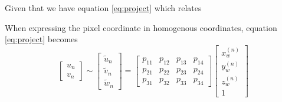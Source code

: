 Given that we have equation \ref{eq:project} which relates



When expressing the pixel coordinate in homogenous coordinates, equation \ref{eq:project} becomes
\begin{equation}
    \begin{bmatrix}
        u_n \\ v_n
    \end{bmatrix}
    \sim
    \begin{bmatrix}
        \widetilde{u}_n \\ \widetilde{v}_n \\ \widetilde{w}_n
    \end{bmatrix}
    =
    \begin{bmatrix}
        p_{11} & p_{12} & p_{13} & p_{14} \\
        p_{21} & p_{22} & p_{23} & p_{24} \\
        p_{31} & p_{32} & p_{33} & p_{34}
    \end{bmatrix}
    \begin{bmatrix}
        x_w^{(n)} \\ y_w^{(n)} \\ z_w^{(n)} \\ 1
    \end{bmatrix}
\end{equation}
